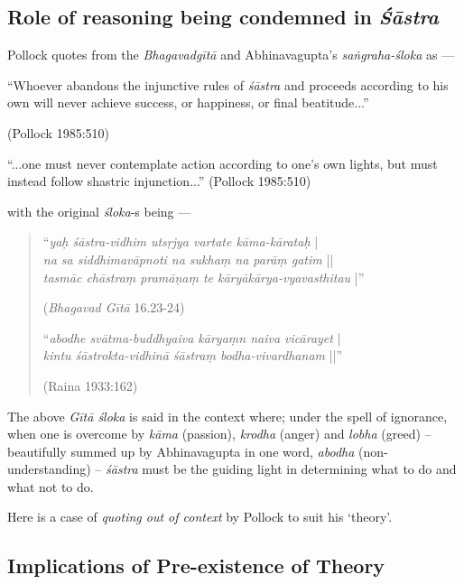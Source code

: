 \subsection{Role of reasoning being condemned in {{\sl\bfseries Śāstra}\relax}}\label{art12-sec3.7}

Pollock quotes from the {\sl Bhagavadgītā} and Abhinavagupta's {\sl saṅ\-graha-śloka} as ---
\begin{myquote}
``Whoever abandons the injunctive rules of {\sl śāstra} and proceeds according to his own will never achieve success, or happiness, or ﬁnal beatitude...”

\hfill (Pollock 1985:510)

``...one must never contemplate action according to one's own lights, but must instead follow shastric injunction...'' (Pollock 1985:510)
\end{myquote}
with the original {\sl śloka}-s being ---
\begin{quote}
``{{\sl yaḥ śāstra-vidhim utsṛjya vartate kāma-kārataḥ}} |\\ 
{\sl na sa siddhimavāpnoti na sukhaṃ na parāṃ gatim} ||\\
{\sl tasmāc chāstraṃ pramāṇaṃ te kāryākārya-vyavasthitau} |'' 

\hfill ({\sl Bhagavad Gītā} 16.23-24)

\newpage

``{\sl abodhe svātma-buddhyaiva kāryaṃn naiva vicārayet} |\\
{\sl kintu śāstrokta-vidhinā śāstraṃ bodha-vivardhanam} ||'' 

\hfill (Raina 1933:162)
\end{quote}

The above {\sl Gītā śloka} is said in the context where; under the spell of ignorance, when one is overcome by {\sl kāma} (passion), {\sl krodha} (anger) and {\sl lobha} (greed) -- beautifully summed up by Abhinavagupta in one word, {\sl abodha} (non-understanding) -- {\sl śāstra} must be the guiding light in determining what to do and what not to do. 

Here is a case of {\sl quoting out of context} by Pollock to suit his `theory'.

\subsection{Implications of Pre-existence of Theory}\label{art12-sec3.8}


